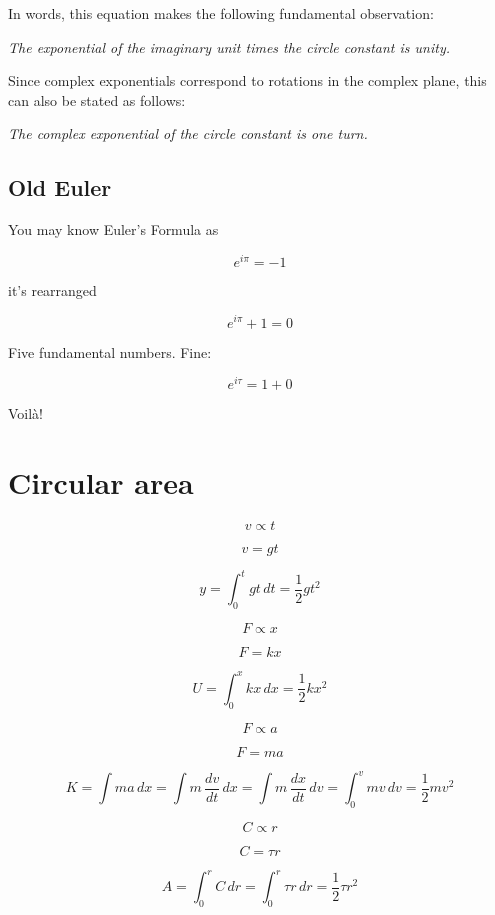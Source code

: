 \documentclass{article}
\begin{document}
In words, this equation makes the following fundamental observation: 

\begin{center}
\emph{The exponential of the imaginary unit times the circle constant is unity.} 
\end{center}

Since complex exponentials correspond to rotations in the complex plane, this can also be stated as follows:

\begin{center}
\emph{The complex exponential of the circle constant is one turn.}
\end{center}

  \subsection{Old Euler}

You may know Euler's Formula as 


\[ e^{i\pi} = -1 \]

it's rearranged

\[ e^{i\pi} + 1 = 0 \]

Five fundamental numbers. Fine:


\[ e^{i\tau} = 1 + 0 \]

Voil\`{a}!

\section{Circular area} %
\label{sec:circular_area}

\[ v \propto t \]

\[ v = g t \]

\[ y = \int_0^t gt\,dt = \textstyle{\frac{1}{2}} gt^2 \]


\[ F \propto x \]

\[ F = k x \]

\[ U = \int_0^x kx\,dx = \textstyle{\frac{1}{2}} kx^2 \]

\[ F \propto a \]

\[ F = m a \]

\[ K = \int ma\,dx = \int m\,\frac{dv}{dt}\,dx = \int m\, \frac{dx}{dt}\,dv = \int_0^v mv\,dv = \textstyle{\frac{1}{2}} mv^2 \]


\[ C \propto r \]

\[ C = \tau r \]

\[ A = \int_0^r C\,dr = \int_0^r \tau r\,dr = \textstyle{\frac{1}{2}} \tau r^2 \]
\end{document}

